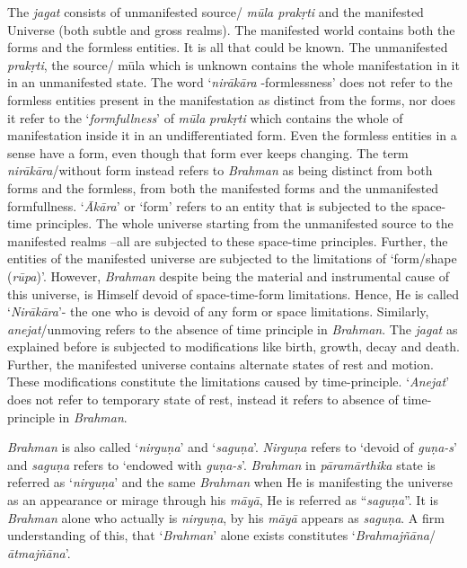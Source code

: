 The \emph{jagat} consists of unmanifested source/ \emph{mūla prakṛti} and the manifested Universe (both subtle and gross realms). The manifested world contains both the forms and the formless entities. It is all that could be known. The unmanifested \emph{prakṛti}, the source/ mūla which is unknown contains the whole manifestation in it in an unmanifested state. The word `\emph{nirākāra} -formlessness' does not refer to the formless entities present in the manifestation as distinct from the forms, nor does it refer to the `\emph{formfullness}' of \emph{mūla} \emph{prakṛti} which contains the whole of manifestation inside it in an undifferentiated form. Even the formless entities in a sense have a form, even though that form ever keeps changing. The term \emph{nirākāra}/without form instead refers to \emph{Brahman} as being distinct from both forms and the formless, from both the manifested forms and the unmanifested formfullness. `\emph{Ākāra}' or `form' refers to an entity that is subjected to the space-time principles. The whole universe starting from the unmanifested source to the manifested realms --all are subjected to these space-time principles. Further, the entities of the manifested universe are subjected to the limitations of `form/shape (\emph{rūpa})'. However, \emph{Brahman} despite being the material and instrumental cause of this universe, is Himself devoid of space-time-form limitations. Hence, He is called `\emph{Nirākāra}'- the one who is devoid of any form or space limitations. Similarly, \emph{anejat}/unmoving refers to the absence of time principle in \emph{Brahman}. The \emph{jagat} as explained before is subjected to modifications like birth, growth, decay and death. Further, the manifested universe contains alternate states of rest and motion. These modifications constitute the limitations caused by time-principle. `\emph{Anejat}' does not refer to temporary state of rest, instead it refers to absence of time-principle in \emph{Brahman}.

\emph{Brahman} is also called `\emph{nirguṇa}' and `\emph{saguṇa}'. \emph{Nirguṇa} refers to `devoid of \emph{guṇa-s}' and \emph{saguṇa} refers to `endowed with \emph{guṇa-s}'. \emph{Brahman} in \emph{pāramārthika} state is referred as `\emph{nirguṇa}' and the same \emph{Brahman} when He is manifesting the universe as an appearance or mirage through his \emph{māyā}, He is referred as ``\emph{saguṇa}''. It is \emph{Brahman} alone who actually is \emph{nirguṇa}, by his \emph{māyā} appears as \emph{saguṇa}. A firm understanding of this, that `\emph{Brahman}' alone exists constitutes `\emph{Brahmajñāna}/\emph{ātmajñāna}'.

